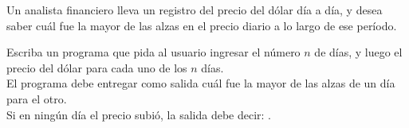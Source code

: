Un analista financiero
lleva un registro del precio del dólar día a día,
y desea saber cuál fue la mayor de las alzas en el precio diario
a lo largo de ese período.

\begin{minipage}[t]{.43\textwidth}
  Escriba un programa que pida al usuario
  ingresar el número \(n\) de días,
  y luego el precio del dólar
  para cada uno de los \(n\) días.
  \\[1ex]
  El programa debe entregar como salida
  cuál fue la mayor de las alzas
  de un día para el otro.
  \\[1ex]
  Si en ningún día el precio subió,
  la salida debe decir: .
\end{minipage}
\hfill
\begin{minipage}[t]{.45\textwidth}
  
\end{minipage}

